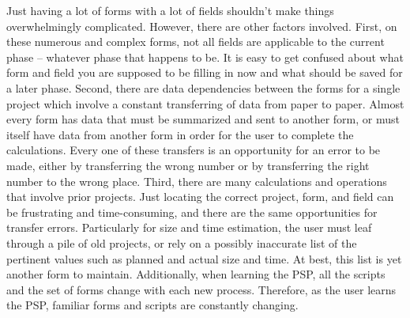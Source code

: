 Just having a lot of forms with a lot of fields shouldn't make things
overwhelmingly complicated. However, there are other factors involved.
First, on these numerous and complex forms, not all fields are applicable
to the current phase -- whatever phase that happens to be.  It is easy to
get confused about what form and field you are supposed to be filling in
now and what should be saved for a later phase.  Second, there are data
dependencies between the forms for a single project which involve a
constant transferring of data from paper to paper.  Almost every form has
data that must be summarized and sent to another form, or must itself have
data from another form in order for the user to complete the calculations.
Every one of these transfers is an opportunity for an error to be made,
either by transferring the wrong number or by transferring the right number
to the wrong place.  Third, there are many calculations and operations that
involve prior projects.  Just locating the correct project, form, and field
can be frustrating and time-consuming, and there are the same opportunities
for transfer errors.  Particularly for size and time estimation, the user
must leaf through a pile of old projects, or rely on a possibly inaccurate
list of the pertinent values such as planned and actual size and time.  At
best, this list is yet another form to maintain. 
Additionally, when learning the PSP, all the scripts and the set of forms
change with each new process.  Therefore, as the user learns the PSP,
familiar forms and scripts are constantly changing.


